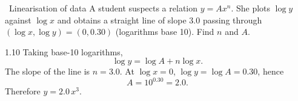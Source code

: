 \begin{exercise}{\mastery\ Linearisation of data}
A student suspects a relation $y=Ax^n$. She plots $\log y$ against $\log x$ and
obtains a straight line of slope $3.0$ passing through
$(\log x,\log y)=(0,0.30)$ (logarithms base 10). Find $n$ and $A$.
\end{exercise}

\begin{tabletworkspace}[6cm]
\end{tabletworkspace}

\begin{solution}{1.10}
Taking base-10 logarithms,
\[
\log y=\log A+n\log x.
\]
The slope of the line is $n=3.0$. At $\log x=0$,
$\log y=\log A=0.30$, hence
\[
A=10^{0.30}=2.0.
\]
Therefore $y=2.0\,x^{3}$.
\end{solution}

